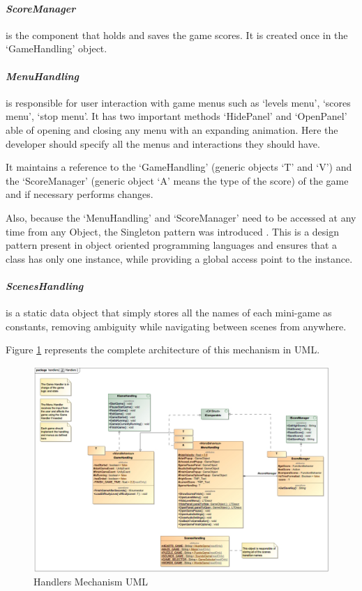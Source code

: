 \paragraph{\textit{ScoreManager}} is the component that holds and saves the game scores. It is created once in the `GameHandling' object.

\paragraph{\textit{MenuHandling}} is responsible for user interaction with game menus such as `levels menu', `scores menu', `stop menu'. It has two important methods `HidePanel' and `OpenPanel' able of opening and closing any menu with an expanding animation. Here the developer should specify all the menus and interactions they should have.

It maintains a reference to the `GameHandling' (generic objects `T' and `V') and the `ScoreManager' (generic object `A' means the type of the score) of the game and if necessary performs changes.

Also, because the `MenuHandling' and `ScoreManager' need to be accessed at any time from any Object, the Singleton pattern was introduced \cite{singleton}. This is a design pattern present in object oriented programming languages and ensures that a class has only one instance, while providing a global access point to the instance.

\paragraph{\textit{ScenesHandling}} is a static data object that simply stores all the names of each mini-game as constants, removing ambiguity while navigating between scenes from anywhere.

Figure \ref{fig:handlers} represents the complete architecture of this mechanism in UML.

\begin{figure}[H]
    \centering
    \includegraphics[scale=.4]{Chapters/arq/new/class_handlers_Handlers.jpg}
    \caption{Handlers Mechanism UML}
    \label{fig:handlers}
\end{figure}

